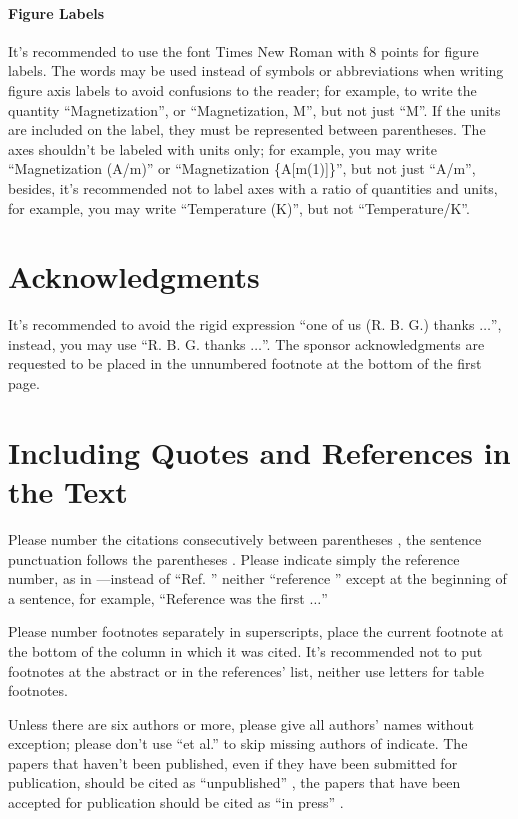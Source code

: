 \documentclass[letterpaper, 10pt, conference]{IEEEtran} %
\begin{document}
	\paragraph{Figure Labels} It's recommended to use the font Times New Roman with 8 points for figure labels. The words may be used instead of symbols or abbreviations when writing figure axis labels to avoid confusions to the reader; for example, to write the quantity ``Magnetization'', or ``Magnetization, M'', but not just ``M''. If the units are included on the label, they must be represented between parentheses. The axes shouldn't be labeled with units only; for example, you may write ``Magnetization (A/m)'' or ``Magnetization \{A[m(1)]\}'', but not just ``A/m'', besides, it's recommended not to label axes with a ratio of quantities and units, for example, you may write ``Temperature (K)'', but not ``Temperature/K''.
	
	\section*{Acknowledgments} \label{sectionAcknowlegments}
	It's recommended to avoid the rigid expression ``one of us (R. B. G.) thanks $\ldots$'', instead, you may use ``R. B. G. thanks $\ldots$''. The sponsor acknowledgments are requested to be placed in the unnumbered footnote at the bottom of the first page.
	
	\section*{Including Quotes and References in the Text} \label{sectionIncludingQuotesAndReferencesInTheText}
	Please number the citations consecutively between parentheses \cite{bibliographicReference4}, the sentence punctuation follows the parentheses \cite{bibliographicReference5}. Please indicate simply the reference number, as in \cite{bibliographicReference6}---instead of ``Ref. \cite{bibliographicReference6}'' neither ``reference \cite{bibliographicReference6}'' except at the beginning of a sentence, for example, ``Reference \cite{bibliographicReference6} was the first $\ldots$''
	
	Please number footnotes separately in superscripts, place the current footnote at the bottom of the column in which it was cited. It's recommended not to put footnotes at the abstract or in the references' list, neither use letters for table footnotes.
	
	Unless there are six authors or more, please give all authors' names without exception; please don't use ``et al.'' to skip missing authors of indicate. The papers that haven't been published, even if they have been submitted for publication, should be cited as ``unpublished'' \cite{bibliographicReference7}, the papers that have been accepted for publication should be cited as ``in press'' \cite{bibliographicReference8}.
	
\end{document}
